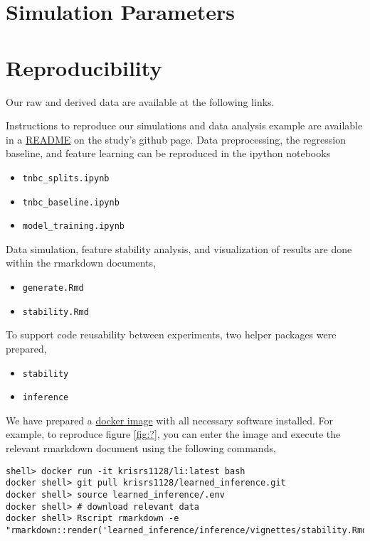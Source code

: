 
\section{Simulation Parameters}


\section{Reproducibility}

Our raw and derived data are available at the following links.



Instructions to reproduce our simulations and data analysis example are
available in a \href{https://github.com/krisrs1128/learned_inference}{README} on the study's github page. Data preprocessing, the
regression baseline, and feature learning can be reproduced in the ipython
notebooks

\begin{itemize}
\item \texttt{tnbc\_splits.ipynb}
\item \texttt{tnbc\_baseline.ipynb}
\item \texttt{model\_training.ipynb}
\end{itemize}

Data simulation, feature stability analysis, and visualization of results are
done within the rmarkdown documents,

\begin{itemize}
\item \texttt{generate.Rmd}
\item \texttt{stability.Rmd}
\end{itemize}

To support code reusability between experiments, two helper packages were prepared,

\begin{itemize}
\item \texttt{stability}
\item \texttt{inference}
\end{itemize}

We have prepared a \href{https://hub.docker.com/r/krisrs1128/li}{docker image}
with all necessary software installed. For example, to reproduce figure
\ref{fig:?}, you can enter the image and execute the relevant rmarkdown document
using the following commands,

\begin{verbatim}
shell> docker run -it krisrs1128/li:latest bash
docker shell> git pull krisrs1128/learned_inference.git
docker shell> source learned_inference/.env
docker shell> # download relevant data
docker shell> Rscript rmarkdown -e "rmarkdown::render('learned_inference/inference/vignettes/stability.Rmd')"
\end{verbatim}
